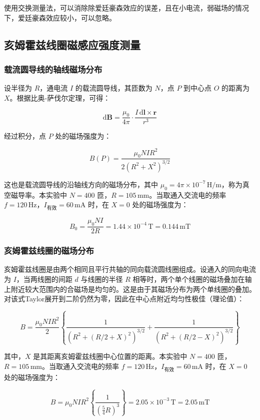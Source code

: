 \documentclass[zihao=5, UTF8]{article}
\theoremstyle{MyLineTheoremStyle} %
\theoremstyle{MyBlockTheoremStyle} %
\theoremstyle{MySubsubsectionStyle} %
\begin{document}
使用交换测量法，可以消除除爱廷豪森效应的误差，且在小电流，弱磁场的情况下，爱廷豪森效应较小，可以忽略。

\subsection{亥姆霍兹线圈磁感应强度测量}

\subsubsection{载流圆导线的轴线磁场分布}

设半径为 $R$，通电流 $I$ 的载流圆导线，其匝数为 $N$，点 $P$ 到中心点 $O$ 的距离为 $X$。根据比奥-萨伐尔定理，可得：

\[
\mathrm{d} \bm B = \frac{\mu_0}{4\pi} \cdot \frac{I \, \mathrm{d}\bm{l} \times \bm{r}}{r^3}
\]

经过积分，点 $P$ 处的磁场强度为：

\[
B(P) = \frac{\mu_0 N I R^2}{2(R^2 + X^2)^{3/2}}
\]

这也是载流圆导线的沿轴线方向的磁场分布，其中 $\mu_0 = 4\pi \times 10^{-7} \, \text{H/m}$，称为真空磁导率。本实验中 $N = 400$ 匝，$R = 105 \, \text{mm}$。当取通入交流电的频率 $f = 120 \, \text{Hz}$，$I_{\text{有效}} = 60 \, \text{mA}$ 时，在 $X=0$ 处的磁场强度为：

\[
B_0 = \frac{\mu_0 N I}{2R} = 1.44 \times 10^{-4} \, \text{T} = 0.144 \, \text{mT}
\]

\subsubsection{亥姆霍兹线圈的磁场分布}

亥姆霍兹线圈是由两个相同且平行共轴的同向载流圆线圈组成。设通入的同向电流为 $I$，当两线圈的间距 $d$ 与线圈的半径 $R$ 相等时，两个单个线圈的磁场叠加在轴上附近较大范围内的合磁场是均匀的。这是由于其磁场分布为两个单线圈的叠加。对该式Taylor展开到二阶仍然为零，因此在中心点附近均匀性极佳（理论值）：

\[
B = \frac{\mu_0 N I R^2}{2} \left\{ \frac{1}{(R^2+(R/2+X)^2)^{3/2}} + \frac{1}{(R^2+(R/2-X)^2)^{3/2}} \right\}
\]

其中，$X$ 是其距离亥姆霍兹线圈中心位置的距离。本实验中 $N=400$ 匝，$R=105 \, \text{mm}$。当取通入交流电的频率 $f=120 \, \text{Hz}$，$I_{\text{有效}}=60 \, \text{mA}$ 时，在 $X=0$ 处的磁场强度为：

\[
B = \mu_0 N I R^2 \left\{ \frac{1}{\left(\frac{5}{4} R\right)^3} \right\} = 2.05 \times 10^{-3} \, \text{T} = 2.05 \, \text{mT}
\]
\end{document}
